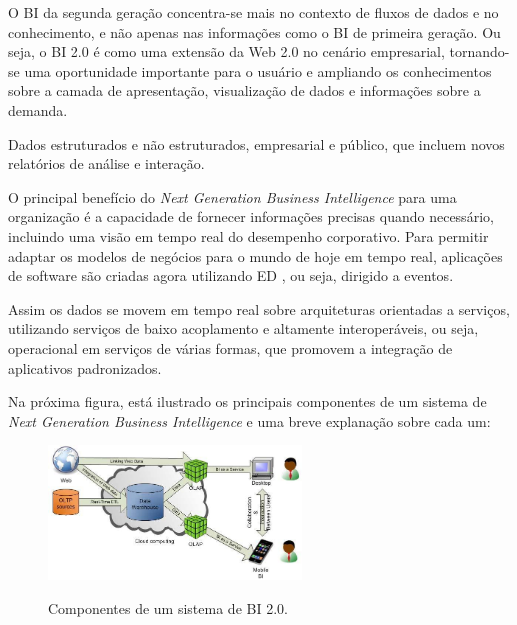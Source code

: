 O BI da segunda gera\c{c}\~{a}o concentra-se mais no contexto de fluxos de dados e no conhecimento, e n\~{a}o apenas nas informa\c{c}\~{o}es como o BI de primeira gera\c{c}\~{a}o. Ou seja, o BI 2.0 \'{e} como uma extens\~{a}o da Web 2.0 no cen\'{a}rio empresarial, tornando-se uma oportunidade importante para o usu\'{a}rio e ampliando os conhecimentos sobre a camada de apresenta\c{c}\~{a}o, visualiza\c{c}\~{a}o de dados e informa\c{c}\~{o}es sobre a demanda. 

Dados estruturados e n\~{a}o estruturados, empresarial e público, que incluem novos relat\'{o}rios de an\'{a}lise e intera\c{c}\~{a}o.

O principal benef\'{i}cio do \textit{Next Generation Business Intelligence} para uma organiza\c{c}\~{a}o \'{e} a capacidade de fornecer informa\c{c}\~{o}es precisas quando necess\'{a}rio, incluindo uma vis\~{a}o em tempo real do desempenho corporativo. Para permitir adaptar os modelos de neg\'{o}cios para o mundo de hoje em tempo real, aplica\c{c}\~{o}es de software s\~{a}o criadas agora utilizando ED , ou seja, dirigido a eventos. 

Assim os dados se movem em tempo real sobre arquiteturas orientadas a servi\c{c}os, utilizando servi\c{c}os de baixo acoplamento e altamente interoper\'{a}veis, ou seja, operacional em servi\c{c}os de v\'{a}rias formas, que promovem a integra\c{c}\~{a}o de aplicativos padronizados.

Na pr\'{o}xima figura, est\'{a} ilustrado os principais componentes de um sistema de \textit{Next Generation Business Intelligence} e uma breve explana\c{c}\~{a}o sobre cada um:

\begin{figure}[H]
	\vspace*{0,2cm}
    \centering
    \caption{Componentes de um sistema de BI 2.0.}
    \includegraphics[width=0.6\textwidth]{./04-figuras/figura-03}
    \label{fig:ilustfig03}
\end{figure}
\vspace*{-0,9cm}
{\raggedright {}}\\

